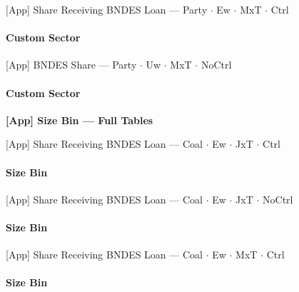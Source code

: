 \documentclass[aspectratio=169,10pt]{beamer}
\newcommand{\tgroup}{../tables/agg_firm_grouped}
\newcommand{\tsize}{../tables/agg_firm_size_bin}
\begin{document}
\begin{frame}[t,shrink=5]{[App] Share Receiving BNDES Loan --- Party $\cdot$ Ew $\cdot$ MxT $\cdot$ Ctrl}
\framesubtitle{Custom Sector}
\begin{center}\footnotesize

\end{center}
\end{frame}

\begin{frame}[t,shrink=5]{[App] BNDES Share --- Party $\cdot$ Uw $\cdot$ MxT $\cdot$ NoCtrl}
\framesubtitle{Custom Sector}
\begin{center}\footnotesize

\end{center}
\end{frame}

\begin{frame}[plain]
\begin{center}
{\Large\textbf{[App] Size Bin --- Full Tables}}
\end{center}
\end{frame}

\begin{frame}[t,shrink=5]{[App] Share Receiving BNDES Loan --- Coal $\cdot$ Ew $\cdot$ JxT $\cdot$ Ctrl}
\framesubtitle{Size Bin}
\begin{center}\footnotesize

\end{center}
\end{frame}

\begin{frame}[t,shrink=5]{[App] Share Receiving BNDES Loan --- Coal $\cdot$ Ew $\cdot$ JxT $\cdot$ NoCtrl}
\framesubtitle{Size Bin}
\begin{center}\footnotesize

\end{center}
\end{frame}

\begin{frame}[t,shrink=5]{[App] Share Receiving BNDES Loan --- Coal $\cdot$ Ew $\cdot$ MxT $\cdot$ Ctrl}
\framesubtitle{Size Bin}
\begin{center}\footnotesize

\end{center}
\end{frame}
\end{document}
